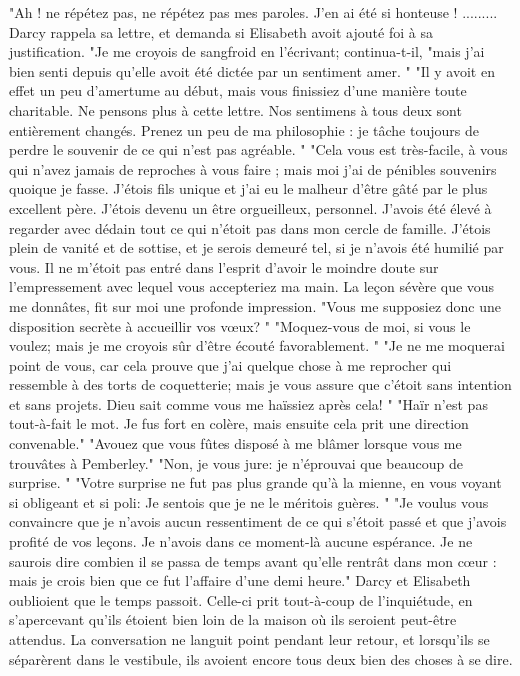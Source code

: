 "Ah ! ne répétez pas, ne répétez pas mes paroles. J'en ai été si honteuse ! .........
Darcy rappela sa lettre, et demanda si Elisabeth avoit ajouté foi à sa justification. "Je me croyois de sangfroid en l'écrivant; continua-t-il, "mais j'ai bien senti depuis qu'elle avoit été dictée par un sentiment amer. "
"Il y avoit en effet un peu d'amertume au début, mais vous finissiez d'une manière toute charitable. Ne pensons plus à cette lettre. Nos sentimens à tous deux sont entièrement changés. Prenez un peu de ma philosophie : je tâche toujours de perdre le souvenir de ce qui n'est pas agréable. "
"Cela vous est très-facile, à vous qui n'avez jamais de reproches à vous faire ; mais moi j'ai de pénibles souvenirs quoique je fasse. J'étois fils unique et j'ai eu le malheur d'être gâté par le plus excellent père. J'étois devenu un être orgueilleux, personnel. J'avois été élevé à regarder avec dédain tout ce qui n'étoit pas dans mon cercle de famille. J'étois plein de vanité et de sottise, et je serois demeuré tel, si je n'avois été humilié par vous. Il ne m'étoit pas entré dans l'esprit d'avoir le moindre doute sur l'empressement avec lequel vous accepteriez ma main.\setcounter{page}{266} La leçon sévère que vous me donnâtes, fit sur moi une profonde impression.
"Vous me supposiez donc une disposition secrète à accueillir vos vœux? "
"Moquez-vous de moi, si vous le voulez; mais je me croyois sûr d'être écouté favorablement. "
"Je ne me moquerai point de vous, car cela prouve que j'ai quelque chose à me reprocher qui ressemble à des torts de coquetterie; mais je vous assure que c'étoit sans intention et sans projets. Dieu sait comme vous me haïssiez après cela! "
"Haïr n'est pas tout-à-fait le mot. Je fus fort en colère, mais ensuite cela prit une direction convenable."
"Avouez que vous fûtes disposé à me blâmer lorsque vous me trouvâtes à Pemberley."
"Non, je vous jure: je n'éprouvai que beaucoup de surprise. "
"Votre surprise ne fut pas plus grande qu'à la mienne, en vous voyant si obligeant et si poli: Je sentois que je ne le méritois guères. "
"Je voulus vous convaincre que je n'avois aucun ressentiment de ce qui s'étoit passé et que j'avois profité de vos leçons. Je n'avois dans ce moment-là aucune espérance. Je ne saurois dire combien il se passa de temps\setcounter{page}{267} avant qu'elle rentrât dans mon cœur : mais je crois bien que ce fut l'affaire d'une demi heure."
Darcy et Elisabeth oublioient que le temps passoit. Celle-ci prit tout-à-coup de l'inquiétude, en s'apercevant qu'ils étoient bien loin de la maison où ils seroient peut-être attendus. La conversation ne languit point pendant leur retour, et lorsqu'ils se séparèrent dans le vestibule, ils avoient encore tous deux bien des choses à se dire.
